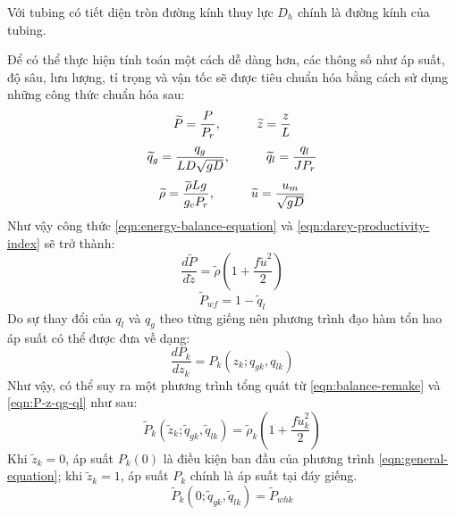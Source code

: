\documentclass[12pt,a4paper]{report}
\begin{document}
Với tubing có tiết diện tròn đường kính thuy lực $D_h$ chính là đường kính của tubing.

Để có thể thực hiện tính toán một cách dễ dàng hơn, các thông số như áp suất, độ sâu, lưu lượng, tỉ trọng và vận tốc sẽ được tiêu chuẩn hóa bằng cách sử dụng những công thức chuẩn hóa sau:
	\begin{equation}\label{eqn:P-z-scaling}
		\widetilde{P} = \dfrac{P}{P_r},\hspace*{1cm}\widetilde{z} = \dfrac{z}{L}
	\end{equation}
	\begin{equation}\label{eqn:qg-ql-scaling}
		\widetilde{q}_g = \dfrac{q_g}{LD\sqrt{gD}},\hspace*{1cm}\widetilde{q}_l = \dfrac{q_l}{JP_r}
	\end{equation}
	\begin{equation}\label{eqn:rho-velocity}
		\widetilde{\rho} = \dfrac{\overline{\rho}Lg}{g_cP_r},\hspace*{1cm}\widetilde{u} = \dfrac{u_m}{\sqrt{gD}}
	\end{equation}
Như vậy công thức \ref{eqn:energy-balance-equation} và \ref{eqn:darcy-productivity-index} sẽ trở thành:
	\begin{equation}\label{eqn:balance-remake}
		\dfrac{d\widetilde{P}}{d\widetilde{z}} = \widetilde{\rho}(1 + \dfrac{f\widetilde{u}^2}{2})
	\end{equation}
	\begin{equation}
		\widetilde{P}_{wf} = 1 - \widetilde{q}_l
	\end{equation}
Do sự thay đổi của $q_l$ và $q_g$ theo từng giếng nên phương trình đạo hàm tổn hao áp suất có thể được đưa về dạng:
	\begin{equation}\label{eqn:P-z-qg-ql}
		\dfrac{dP_k}{dz_k} = P_k(z_k; q_{gk}, q_{lk})
	\end{equation}
Như vậy, có thể suy ra một phương trình tổng quát từ \ref{eqn:balance-remake} và \ref{eqn:P-z-qg-ql} như sau:
	\begin{equation}\label{eqn:general-equation}
		\widetilde{P}_k(\widetilde{z}_k; \widetilde{q}_{gk}, \widetilde{q}_{lk}) = \widetilde{\rho}_k(1 + \dfrac{f\widetilde{u}_k^2}{2})
	\end{equation}
Khi $\widetilde{z}_k = 0$, áp suất $P_k(0)$ là điều kiện ban đầu của phương trình \ref{eqn:general-equation}; khi $\widetilde{z}_k = 1$, áp suất $P_k$ chính là áp suất tại đáy giếng.
	\begin{equation}\label{eqn:P-z=0}
		\widetilde{P}_k(0; \widetilde{q}_{gk}, \widetilde{q}_{lk}) = \widetilde{P}_{whk}
	\end{equation}
\end{document}
